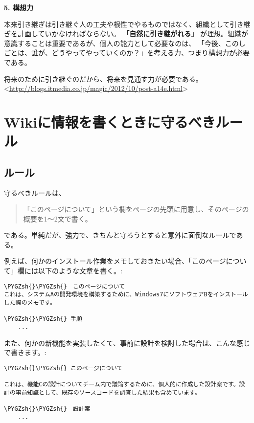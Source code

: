 \documentclass[letterpaper,10pt,dvipdfmx]{sphinxmanual}
\def\PYGZsh{\char`\#}
\begin{document}
\textbf{5. 構想力}

本来引き継ぎは引き継ぐ人の工夫や根性でやるものではなく、組織として引き継ぎを計画していかなければならない。 \textbf{「自然に引き継がれる」} が理想。組織が意識することは重要であるが、個人の能力として必要なのは、
「今後、このしごとは、誰が、どうやってやっていくのか？」を考える力、つまり構想力が必要である。

将来のために引き継ぐのだから、将来を見通す力が必要である。
\textless{}\url{http://blogs.itmedia.co.jp/magic/2012/10/post-a14e.html}\textgreater{}


\section{Wikiに情報を書くときに守るべきルール}
\label{tips:wiki}

\subsection{ルール}
\label{tips:id6}
守るべきルールは、
\begin{quote}

「このページについて」という欄をページの先頭に用意し、そのページの概要を1～2文で書く。
\end{quote}

である。単純だが、強力で、きちんと守ろうとすると意外に面倒なルールである。

例えば、何かのインストール作業をメモしておきたい場合、「このページについて」欄には以下のような文章を書く。:

\begin{Verbatim}[commandchars=\\\{\}]
\PYGZsh{}\PYGZsh{}　このページについて
これは、システムAの開発環境を構築するために、Windows7にソフトウェアBをインストールした際のメモです。

\PYGZsh{}\PYGZsh{} 手順
    ...
\end{Verbatim}

また、何かの新機能を実装したくて、事前に設計を検討した場合は、こんな感じで書きます。:

\begin{Verbatim}[commandchars=\\\{\}]
\PYGZsh{}\PYGZsh{} このページについて

これは、機能Cの設計についてチーム内で議論するために、個人的に作成した設計案です。設計の事前知識として、既存のソースコードを調査した結果も含めています。

\PYGZsh{}\PYGZsh{}　設計案
    ...
\end{Verbatim}
\end{document}
